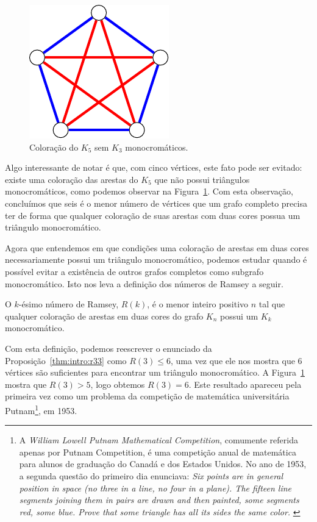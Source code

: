\begin{figure}[ht!]
\centering
\includegraphics{figures/1_intro_5_pentagram}
\caption{Coloração do $K_5$ sem $K_3$ monocromáticos.}
\label{fig:intro:r33lb}
\end{figure}

Algo interessante de notar é que, com cinco vértices, este fato pode ser evitado: existe uma coloração das arestas do $K_5$ que não possui triângulos monocromáticos, como podemos observar na Figura~\ref{fig:intro:r33lb}. Com esta observação, concluímos que seis é o menor número de vértices que um grafo completo precisa ter de forma que qualquer coloração de suas arestas com duas cores possua um triângulo monocromático.

Agora que entendemos em que condições uma coloração de arestas em duas cores necessariamente possui um triângulo monocromático, podemos estudar quando é possível evitar a existência de outros grafos completos como subgrafo monocromático. Isto nos leva a definição dos números de Ramsey a seguir.

\begin{definition}
O $k$-ésimo número de Ramsey, $R(k)$, é o menor inteiro positivo $n$ tal que qualquer coloração de arestas em duas cores do grafo $K_n$ possui um $K_k$ monocromático.
\end{definition}

Com esta definição, podemos reescrever o enunciado da Proposição~\ref{thm:intro:r33} como $R(3) \leq 6$, uma vez que ele nos mostra que 6 vértices são suficientes para encontrar um triângulo monocromático.  A Figura~\ref{fig:intro:r33lb} mostra que $R(3) > 5$, logo obtemos $R(3) = 6$. Este resultado apareceu pela primeira vez como um problema da competição de matemática universitária Putnam\footnote{A \emph{William Lowell Putnam Mathematical Competition}, comumente referida apenas por Putnam Competition, é uma competição anual de matemática para alunos de graduação do Canadá e dos Estados Unidos. No ano de 1953, a segunda questão do primeiro dia enunciava:
\emph{Six points are in general position in space (no three in a line, no four in a plane). The fifteen line segments joining them in pairs are drawn and then painted, some segments red, some blue. Prove that some triangle has all its sides the same color.} \cite{putnam}}, em 1953.

